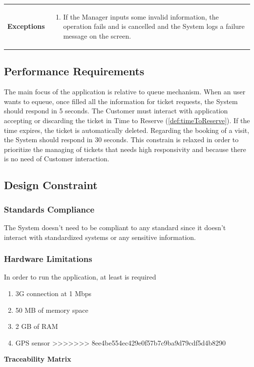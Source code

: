\documentclass[a4paper, 12pt, oneside]{article}
\begin{document}
\begin{enumerate}[labelindent=20pt, label={UC.\arabic*}, itemindent=1em,leftmargin=!]
\begin{tabularx}{\linewidth}{| l | X |}
	\hline
	\textbf{Exceptions} & \parbox{0.7\textwidth}{ \begin{enumerate}
			\item If the Manager inputs some invalid information, the operation fails and is cancelled and the System logs a failure message on the screen.
		\end{enumerate}}\\

	\hline
	
\end{tabularx}

\subsection{Performance Requirements}
The main focus of the application is relative to queue mechanism.
When an user wants to equeue, once filled all the information for ticket requests, the System should respond in 5 seconds. The Customer must interact with application accepting or discarding the ticket in Time to Reserve  (\ref{def:timeToReserve}). If the time expires, the ticket is automatically deleted.
Regarding the booking of a visit, the System should respond in 30 seconds. This constrain is relaxed in order to prioritize the managing of tickets that needs high responsivity and because there is no need of Customer interaction.

\subsection{Design Constraint}
\subsubsection{Standards Compliance}
The System doesn't need to be compliant to any standard since it doesn't interact with standardized systems or any sensitive information.
\subsubsection{Hardware Limitations}
In order to run the application, at least is required
\begin{enumerate}
    \item 3G connection at 1 Mbps
    \item 50 MB of memory space
    \item 2 GB of RAM
    \item GPS sensor
>>>>>>> 8ee4be554ec429e0f57b7c9ba9d79cdf5d4b8290
\end{enumerate}
\newpage
\label{uc:traceabilityMatrix}
\begin{center}
{\textbf{Traceability Matrix}}
\end{center}


\end{enumerate}
\end{document}

